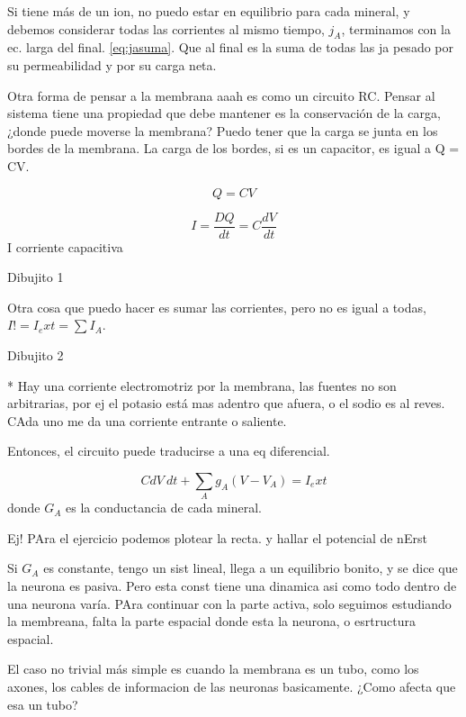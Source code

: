 Si tiene más de un ion, no puedo estar en equilibrio para cada mineral, y debemos considerar todas las corrientes al mismo tiempo, $j_A$, terminamos con la ec. larga del final. \ref{eq:jasuma}. Que al final es la suma de todas las ja pesado por su permeabilidad y por su carga neta.

Otra forma de pensar a la membrana aaah es como un circuito RC. Pensar al sistema tiene una propiedad que debe mantener es la conservación de la carga, ¿donde puede moverse la membrana? Puedo tener que la carga se junta en los bordes de la membrana.  La carga de los bordes, si es un capacitor, es igual a Q = CV.

\begin{equation}
	Q= CV
\end{equation}

\begin{equation}
	I = \frac{DQ}{dt} = C\frac{dV}{dt} \label{todas}
\end{equation}
I corriente capacitiva

Dibujito 1

Otra cosa que puedo hacer es sumar las corrientes, pero no es igual a todas, $I != I_ext = \sum I_A$.

Dibujito 2

* Hay una corriente electromotriz por la membrana, las fuentes no son arbitrarias, por ej el potasio está mas adentro que afuera, o el sodio es al reves. CAda uno me da una corriente entrante o saliente. 

Entonces, el circuito puede traducirse a una eq diferencial.

\begin{equation}
	C dV\ dt + \sum_A g_A (V-V_A) = I_ext
\end{equation}
donde $G_A$ es la conductancia de cada mineral.

Ej! PAra el ejercicio podemos plotear la recta. y hallar el potencial de nErst

Si $G_A$ es constante, tengo un sist lineal, llega a un equilibrio bonito, y se dice que la neurona es pasiva. Pero esta const tiene una dinamica asi como todo dentro de una neurona varía. PAra continuar con la parte activa, solo seguimos estudiando la membreana, falta la parte espacial donde esta la neurona, o esrtructura espacial. 

El caso no trivial más simple es cuando la membrana es un tubo, como los axones, los cables de informacion de las neuronas basicamente. ¿Como afecta que esa un tubo? 


